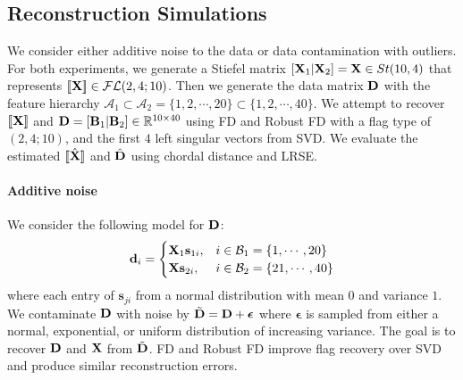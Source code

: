 \subsection{Reconstruction Simulations}
We consider either additive noise to the data or data contamination with outliers. For both experiments, we generate a Stiefel matrix $[ \mathbf{X}_1 | \mathbf{X}_2 ] = \mathbf{X} \in St(10,4)$ that represents $[\![ \mathbf{X} ]\!] \in \mathcal{FL}(2,4;10)$. Then we generate the data matrix $\mathbf{D}$ with the feature hierarchy $\mathcal{A}_1 \subset \mathcal{A}_2 = \{ 1,2, \cdots, 20\} \subset \{1,2, \cdots, 40\}$. We attempt to recover $[\![ \mathbf{X}]\!]$ and $\mathbf{D} = [\mathbf{B}_1| \mathbf{B}_2] \in \mathbb{R}^{10 \times 40}$ using FD and Robust FD with a flag type of $(2,4;10)$, and the first $4$ left singular vectors from SVD. We evaluate the estimated $[\![\hat{\mathbf{X}}]\!]$ and $\hat{\mathbf{D}}$ using chordal distance and LRSE.

 


\paragraph{Additive noise}
We consider the following model for $\mathbf{D}$:
\begin{equation}
    \mathbf{d}_i = \begin{cases}
        \mathbf{X}_1 \mathbf{s}_{1i}, & i \in \mathcal{B}_1 = \{1,\cdots, 20\}\\
        \mathbf{X}\mathbf{s}_{2i}, & i \in \mathcal{B}_2 = \{21,\cdots, 40\}\\
    \end{cases}
\end{equation}
where each entry of $\mathbf{s}_{ji}$ from a normal distribution with mean $0$ and variance $1$. We contaminate $\mathbf{D}$ with noise by $\tilde{\mathbf{D}} = \mathbf{D}  + \boldsymbol{\epsilon}$ where $\boldsymbol{\epsilon}$ is sampled from either a normal, exponential, or uniform distribution of increasing variance. The goal is to recover $\mathbf{D}$ and $\mathbf{X}$ from $\tilde{\mathbf{D}}$. FD and Robust FD improve flag recovery over SVD and produce similar reconstruction errors. %







